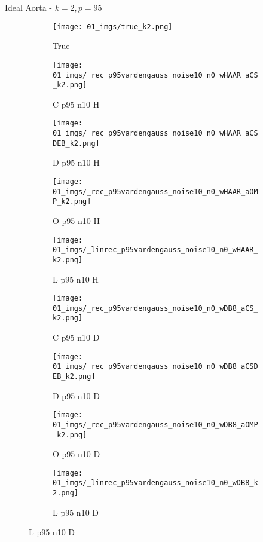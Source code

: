 \begin{frame}{Ideal Aorta - $k=2,p=95$}{}
\begin{figure}
\begin{subfigure}{0.1\textwidth}
\texttt{[image: 01\_imgs/true\_k2.png]}
\caption*{\Tiny True}
\end{subfigure}
\begin{subfigure}{0.1\textwidth}
\texttt{[image: 01\_imgs/\_rec\_p95vardengauss\_noise10\_n0\_wHAAR\_aCS\_k2.png]}
\caption*{\Tiny C p95 n10 H}
\end{subfigure}
\begin{subfigure}{0.1\textwidth}
\texttt{[image: 01\_imgs/\_rec\_p95vardengauss\_noise10\_n0\_wHAAR\_aCSDEB\_k2.png]}
\caption*{\Tiny D p95 n10 H}
\end{subfigure}
\begin{subfigure}{0.1\textwidth}
\texttt{[image: 01\_imgs/\_rec\_p95vardengauss\_noise10\_n0\_wHAAR\_aOMP\_k2.png]}
\caption*{\Tiny O p95 n10 H}
\end{subfigure}
\begin{subfigure}{0.1\textwidth}
\texttt{[image: 01\_imgs/\_linrec\_p95vardengauss\_noise10\_n0\_wHAAR\_k2.png]}
\caption*{\Tiny L p95 n10 H}
\end{subfigure}
\begin{subfigure}{0.1\textwidth}
\texttt{[image: 01\_imgs/\_rec\_p95vardengauss\_noise10\_n0\_wDB8\_aCS\_k2.png]}
\caption*{\Tiny C p95 n10 D}
\end{subfigure}
\begin{subfigure}{0.1\textwidth}
\texttt{[image: 01\_imgs/\_rec\_p95vardengauss\_noise10\_n0\_wDB8\_aCSDEB\_k2.png]}
\caption*{\Tiny D p95 n10 D}
\end{subfigure}
\begin{subfigure}{0.1\textwidth}
\texttt{[image: 01\_imgs/\_rec\_p95vardengauss\_noise10\_n0\_wDB8\_aOMP\_k2.png]}
\caption*{\Tiny O p95 n10 D}
\end{subfigure}
\begin{subfigure}{0.1\textwidth}
\texttt{[image: 01\_imgs/\_linrec\_p95vardengauss\_noise10\_n0\_wDB8\_k2.png]}
\caption*{\Tiny L p95 n10 D}
\end{subfigure}

\vspace{5pt}


\end{figure}
\end{frame}
